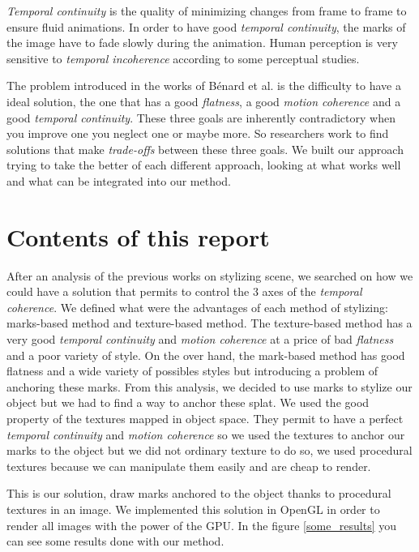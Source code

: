 \textit{Temporal continuity} is the quality of minimizing changes from frame to frame to ensure fluid animations. In order to have good \textit{temporal continuity}, the marks of the image have to fade slowly during the animation. Human perception is very sensitive to \textit{temporal incoherence} according to some perceptual studies\cite{percept_studies, Schwarz_2009}. \newline


The problem introduced in the works of Bénard et al.\cite{benard_state---art_2011} is the difficulty to have a ideal solution, the one that has a good \textit{flatness}, a good \textit{motion coherence} and a good \textit{temporal continuity}. These three goals are inherently contradictory when you improve one you neglect one or maybe more. So researchers work to find solutions that make \textit{trade-offs} between these three goals. We built our approach trying to take the better of each different approach, looking at what works well and what can be integrated into our method.

\section{Contents of this report}

After an analysis of the previous works on stylizing scene, we searched on how we could have a solution that permits to control the 3 axes of the \textit{temporal coherence}. We defined what were the advantages of each method of stylizing: marks-based method and texture-based method. The texture-based method has a very good \textit{temporal continuity} and \textit{motion coherence} at a price of bad \textit{flatness} and a poor variety of style. On the over hand, the mark-based method has good flatness and a wide variety of possibles styles but introducing a problem of anchoring these marks. From this analysis, we decided to use marks to stylize our object but we had to find a way to anchor these splat. We used the good property of the textures mapped in object space. They permit to have a perfect \textit{temporal continuity} and \textit{motion coherence} so we used the textures to anchor our marks to the object but we did not ordinary texture to do so, we used procedural textures because we can manipulate them easily and are cheap to render. \newline

This is our solution, draw marks anchored to the object thanks to procedural textures in an image. We implemented this solution in OpenGL in order to render all images with the power of the GPU. In the figure \ref{some_results} you can see some results done with our method.


